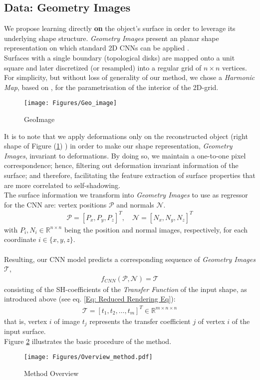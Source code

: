 \subsection{Data: Geometry Images}
We propose learning directly \textbf{on} the object's surface in order to leverage its underlying shape structure. \textit{Geometry Images} present an planar shape representation on which standard 2D CNNs can be applied \cite{gu2002geometry, sinha2016deep}. 
\\ 
Surfaces with a single boundary (topological disks) are mapped onto a unit square and later discretized (or resampled) into a regular grid of $n \times n$ vertices. 
For simplicity, but without loss of generality of our method, we  chose a \textit{Harmonic Map}, based on \cite{HarmonicMapping}, for the parametrisation of the interior of the 2D-grid. 
\begin{figure}[H]
  \centering
    \texttt{[image: Figures/Geo\_image]}
     \caption{GeoImage}
     \label{Fig: GeoImage}
\end{figure}
It is to note that we apply deformations only on the reconstructed object (right shape of Figure (\ref{Fig: GeoImage}) ) in order to make our shape representation, \textit{Geometry Images}, invariant to deformations. By doing so, we maintain a one-to-one pixel correspondence; hence, filtering out deformation invariant information of the surface; and therefore, facilitating the feature extraction of surface properties that are more correlated to self-shadowing. 
\\
The surface information we transform into \textit{Geometry Images} to use as regressor for the CNN are: vertex positions $\mathcal{P}$ and normals $\mathcal{N}$. 
\begin{align*}
	\mathcal{P} = [ P_x, P_y, P_z ]^T , \quad
	\mathcal{N} = [ N_x, N_y, N_z ] ^T 
\end{align*}
with  $P_i, N_i \in \mathbb{R}^{n \times n }$ being the position and normal images, respectively, for each coordinate $i \in \{ x,y,z\}$.
\\
\\
Resulting, our CNN model predicts a corresponding sequence of \textit{Geometry Images} $\mathcal{T}$,
\begin{align*}
	f_{CNN} (  \mathcal{P} , \mathcal{N} ) = \mathcal{T} 
\end{align*}
consisting of the SH-coefficients of the \textit{Transfer Function} of the input shape, as introduced above (see eq. \ref{Eq: Reduced Rendering Eq}):
\begin{align*}
	\mathcal{T} = [ t_1, t_2, \dots, t_m ]^T \in \mathbb{R}^{m \times n \times n} 
\end{align*}
that is, vertex $i$ of image $t_j$ represents the transfer coefficient $j$ of vertex $i$ of the input surface.
\\
Figure \ref{Fig: Method_Overview} illustrates the basic procedure of the method.
\begin{figure}[h]
  \centering
    \texttt{[image: Figures/Overview\_method.pdf]}
     \caption{Method Overview}
     \label{Fig: Method_Overview}
\end{figure}
